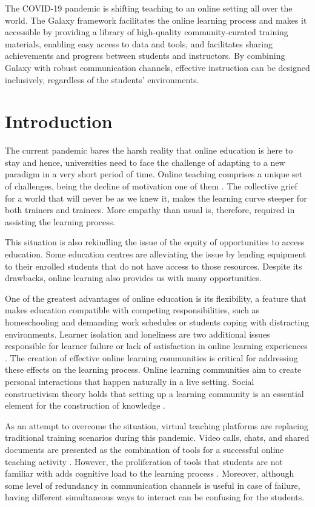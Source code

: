 The COVID-19 pandemic is shifting teaching to an online setting all over the world. The Galaxy framework facilitates the online learning process and makes it accessible by providing a library of high-quality community-curated training materials, enabling easy access to data and tools, and facilitates sharing achievements and progress between students and instructors. By combining Galaxy with robust communication channels, effective instruction can be designed inclusively, regardless of the students’ environments.

\section*{Introduction}

The current pandemic bares the harsh reality that online education is here to stay and hence, universities need to face the challenge of adapting to a new paradigm in a very short period of time. Online teaching comprises a unique set of challenges, being the decline of motivation one of them \cite{selvi2010motivating}. The collective grief for a world that will never be as we knew it, makes the learning curve steeper for both trainers and trainees. More empathy than usual is, therefore, required in assisting the learning process.

This situation is also rekindling the issue of the equity of opportunities to access education. Some education centres are alleviating the issue by lending equipment to their enrolled students that do not have access to those resources. Despite its drawbacks, online learning also provides us with many opportunities.

One of the greatest advantages of online education is its flexibility, a feature that makes education compatible with competing responsibilities, such as homeschooling and demanding work schedules or students coping with distracting environments. Learner isolation and loneliness are two additional issues responsible for learner failure or lack of satisfaction in online learning experiences \cite{mcdonald2005breaking}. The creation of effective online learning communities is critical for addressing these effects on the learning process. Online learning communities aim to create personal interactions that happen naturally in a live setting. Social constructivism theory holds that setting up a learning community is an essential element for the construction of knowledge \cite{vygotsky1962thought,lee2014relationships}.

As an attempt to overcome the situation, virtual teaching platforms are replacing traditional training scenarios during this pandemic. Video calls, chats, and shared documents are presented as the combination of tools for a successful online teaching activity \cite{dabbagh2007online}. However, the proliferation of tools that students are not familiar with adds cognitive load to the learning process \cite{chen2011learners}. Moreover, although some level of redundancy in communication channels is useful in case of failure, having different simultaneous ways to interact can be confusing for the students.

